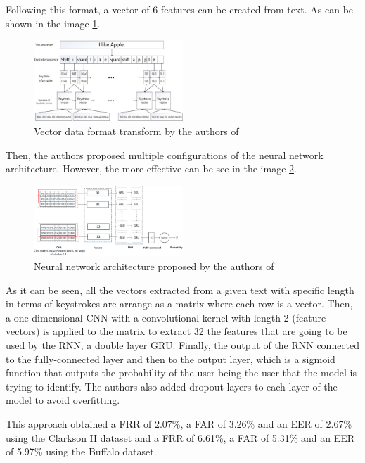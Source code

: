 Following this format, a vector of 6 features can be created from text. As can be shown in the image \ref{fig:deep_learning_vector_data_format}.

\begin{figure}[H]
	\centering
	\includegraphics[width=0.5\textwidth]{images/vectorization.jpg}
	\caption{Vector data format transform by the authors of \cite{deep_learning}}
	\label{fig:deep_learning_vector_data_format}
\end{figure}

Then, the authors proposed multiple configurations of the neural network architecture. However, the more effective can be see in the image \ref{fig:deep_learning_architecture}.

\begin{figure}[H]
	\centering
	\includegraphics[width=0.5\textwidth]{images/architecture.jpg}
	\caption{Neural network architecture proposed by the authors of \cite{deep_learning}}
	\label{fig:deep_learning_architecture}
\end{figure}

As it can be seen, all the vectors extracted from a given text with specific length in terms of keystrokes are arrange as a matrix where each row is a vector. Then, a one dimensional CNN with a convolutional kernel with length 2 (feature vectors) is applied to the matrix to extract 32 the features that are going to be used by the RNN, a double layer GRU. Finally, the output of the RNN connected to the fully-connected layer and then to the output layer, which is a sigmoid function that outputs the probability of the user being the user that the model is trying to identify. The authors also added dropout layers to each layer of the model to avoid overfitting.

This approach obtained a FRR of 2.07\%, a FAR of 3.26\% and an EER of 2.67\% using the Clarkson II dataset and a FRR of 6.61\%, a FAR of 5.31\% and an EER of 5.97\% using the Buffalo dataset.
